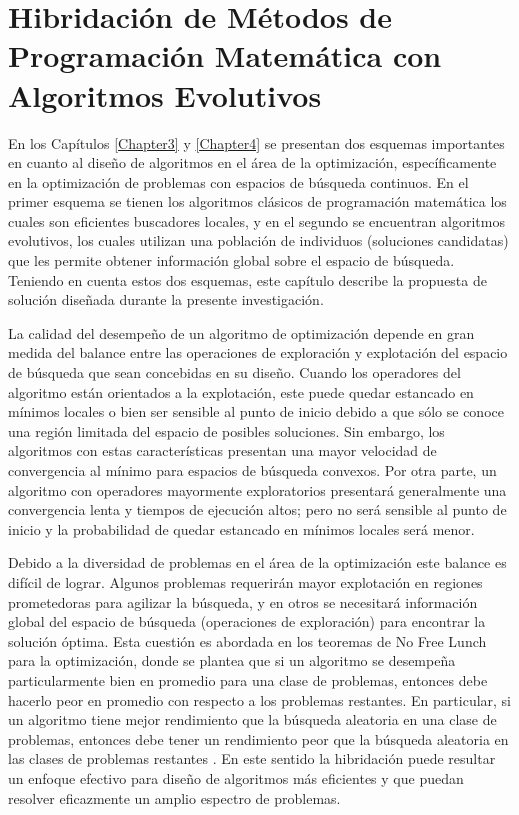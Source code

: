 \chapter{Hibridación de Métodos de Programación Matemática con Algoritmos Evolutivos} \label{Chapter6} 


En los Capítulos \ref{Chapter3} y \ref{Chapter4} se presentan dos esquemas importantes en cuanto al diseño de algoritmos en el área de la optimización, específicamente en la optimización de problemas con espacios de búsqueda continuos. En el primer esquema se tienen los algoritmos clásicos de programación matemática los cuales son eficientes buscadores locales, y  en el segundo se encuentran algoritmos evolutivos, los cuales utilizan una población de individuos (soluciones candidatas) que les permite obtener información global sobre el espacio de búsqueda. Teniendo en cuenta estos dos esquemas, este capítulo describe la propuesta de solución diseñada durante la presente investigación.

La calidad del desempeño de un algoritmo de optimización depende en gran medida del balance entre las operaciones de exploración y explotación del espacio de búsqueda que sean concebidas en su diseño. Cuando los operadores del algoritmo están orientados a la explotación, este puede quedar estancado en mínimos locales o bien ser sensible al punto de inicio debido a que sólo se conoce una región limitada del espacio de posibles soluciones. Sin embargo, los algoritmos con estas características presentan una mayor velocidad de convergencia al mínimo para espacios de búsqueda convexos. Por otra parte, un algoritmo con operadores mayormente exploratorios presentará generalmente una convergencia lenta y tiempos de ejecución altos; pero no será sensible al punto de inicio y la probabilidad de quedar estancado en mínimos locales será menor.

Debido a la diversidad de problemas en el área de la optimización este balance es difícil de lograr. Algunos problemas requerirán mayor explotación en regiones prometedoras para agilizar la búsqueda, y en otros se necesitará información global del espacio de búsqueda (operaciones de exploración) para encontrar la solución óptima. Esta cuestión es abordada en los teoremas de No Free Lunch para la optimización, donde se plantea que si un algoritmo se desempeña particularmente bien en promedio para una clase de problemas, entonces debe hacerlo peor en promedio con respecto a los problemas restantes. En particular, si un algoritmo tiene mejor rendimiento que la búsqueda aleatoria en una clase de problemas, entonces debe tener un rendimiento peor que la búsqueda aleatoria en las clases de problemas restantes \cite{wolpert1997no}. En este sentido la hibridación puede resultar un enfoque efectivo para diseño de algoritmos más eficientes y que puedan resolver eficazmente un amplio espectro de problemas.

